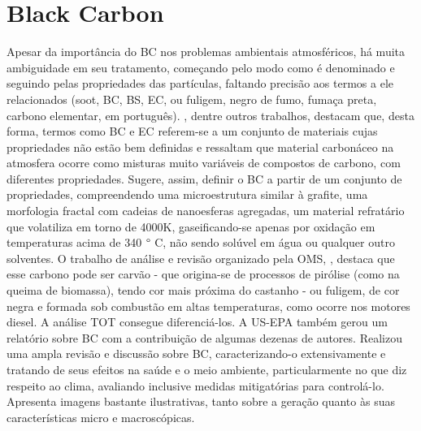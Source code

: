 \newpage
\section{Black Carbon}

Apesar da importância do BC nos problemas ambientais atmosféricos, há muita 
ambiguidade em seu tratamento, começando pelo modo como é denominado e seguindo
pelas propriedades das partículas, faltando precisão aos termos a ele 
relacionados (soot, BC, BS, EC, ou fuligem, negro de fumo, fumaça preta, 
carbono elementar, em português). \citet{petzold2013}, dentre outros trabalhos, 
destacam que, desta forma, termos como BC e EC referem-se a um conjunto de 
materiais cujas propriedades não estão bem definidas e ressaltam que material 
carbonáceo na atmosfera ocorre como misturas muito variáveis de compostos de 
carbono, com diferentes propriedades. Sugere, assim, definir o BC a partir de 
um conjunto de propriedades, compreendendo uma microestrutura similar à grafite,
uma morfologia fractal com cadeias de nanoesferas agregadas, um material 
refratário que volatiliza em torno de 4000K, gaseificando-se apenas por oxidação
em temperaturas acima de 340 $\degree$ C, não sendo solúvel em água ou qualquer
outro solventes. O trabalho de análise e revisão organizado pela OMS, 
\citet{janssen2012}, destaca que esse carbono pode ser carvão - que origina-se 
de processos de pirólise (como na queima de biomassa), tendo cor mais próxima do
castanho - ou fuligem, de cor negra e formada sob combustão em altas 
temperaturas, como ocorre nos motores diesel. A análise TOT consegue 
diferenciá-los. A US-EPA também gerou um relatório sobre BC \citep{epa2012} com
a contribuição de algumas dezenas de autores. Realizou uma ampla revisão e 
discussão sobre BC, caracterizando-o extensivamente e tratando de seus efeitos 
na saúde e o meio ambiente, particularmente no que diz respeito ao clima, 
avaliando inclusive medidas mitigatórias para controlá-lo. 
Apresenta imagens bastante ilustrativas, tanto sobre a geração quanto às suas 
características micro e macroscópicas.

